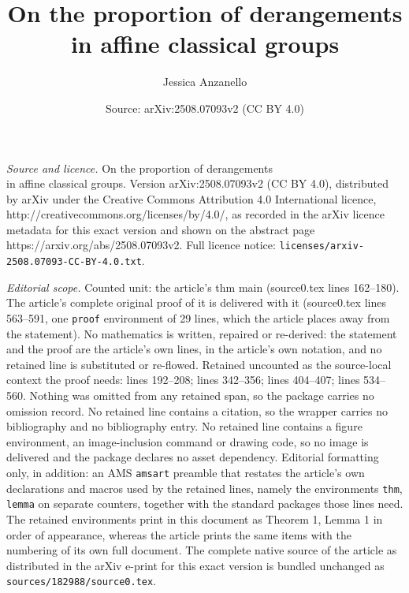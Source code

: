 \documentclass[10pt,a4paper]{amsart}
\title{On the proportion of derangements \\in affine classical groups}
\author{Jessica Anzanello}
\date{Source: arXiv:2508.07093v2 (CC BY 4.0)}
\begin{document}
\maketitle

\noindent\emph{Source and licence.} On the proportion of derangements \\in affine classical groups. Version arXiv:2508.07093v2 (CC BY 4.0), distributed by arXiv under the Creative Commons Attribution 4.0 International licence, http://creativecommons.org/licenses/by/4.0/, as recorded in the arXiv licence metadata for this exact version and shown on the abstract page https://arxiv.org/abs/2508.07093v2. Full licence notice: \texttt{licenses/arxiv-2508.07093-CC-BY-4.0.txt}.\par\smallskip

\noindent\textit{Editorial scope.} Counted unit: the article's thm main (source0.tex lines 162--180). The article's complete original proof of it is delivered with it (source0.tex lines 563--591, one \texttt{proof} environment of 29 lines, which the article places away from the statement). No mathematics is written, repaired or re-derived: the statement and the proof are the article's own lines, in the article's own notation, and no retained line is substituted or re-flowed.  Retained uncounted as the source-local context the proof needs: lines 192--208; lines 342--356; lines 404--407; lines 534--560.  Nothing was omitted from any retained span, so the package carries no omission record.  No retained line contains a citation, so the wrapper carries no bibliography and no bibliography entry.  No retained line contains a figure environment, an image-inclusion command or drawing code, so no image is delivered and the package declares no asset dependency.  Editorial formatting only, in addition: an AMS \texttt{amsart} preamble that restates the article's own declarations and macros used by the retained lines, namely the environments \texttt{thm}, \texttt{lemma} on separate counters, together with the standard packages those lines need.  The retained environments print in this document as Theorem 1, Lemma 1 in order of appearance, whereas the article prints the same items with the numbering of its own full document.  The complete native source of the article as distributed in the arXiv e-print for this exact version is bundled unchanged as \texttt{sources/182988/source0.tex}.
\end{document}
